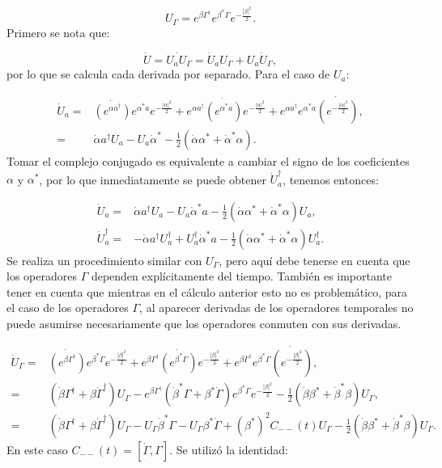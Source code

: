\documentclass[a4paper,10pt]{report}
\begin{document}
\begin{equation}
U_\Gamma = e^{\beta \Gamma^\dagger}e^{\beta^* \Gamma}e^{-\frac{|\beta|^2}{2}}.
\end{equation} Primero se nota que:

\begin{equation}
\dot{U} = \dot{U_aU_\Gamma} = \dot{U}_a U_\Gamma +  U_a \dot{U}_\Gamma,
\end{equation} por lo que se calcula cada derivada por separado. Para el caso de $U_a$:

\begin{align*}
\dot{U}_a =& \dot{(e^{\alpha a^\dagger})}e^{\alpha^* a}e^{-\frac{|\alpha|^2}{2}}
+e^{\alpha a^\dagger}\dot{(e^{\alpha^* a})}e^{-\frac{|\alpha|^2}{2}}+e^{\alpha a^\dagger}e^{\alpha^* a}\dot{(e^{-\frac{|\alpha|^2}{2}})},\\
=&\dot{\alpha} a^\dagger U_a - U_a\dot{\alpha}^* - \frac{1}{2}(\dot{\alpha} \alpha^*+\dot{\alpha}^* \alpha).
\end{align*} Tomar el complejo conjugado es equivalente a cambiar el signo de los coeficientes $\alpha$ y $\alpha^*$, por lo que inmediatamente se puede obtener $\dot{U}_a^\dagger$, tenemos entonces:

\begin{align}
\dot{U}_a=&\dot{\alpha} a^\dagger U_a - U_a\dot{\alpha}^*a - \frac{1}{2}(\dot{\alpha} \alpha^*+\dot{\alpha}^* \alpha)U_a,\\
\dot{U}_a^\dagger=&-\dot{\alpha} a^\dagger U_a^\dagger + U_a^\dagger\dot{\alpha}^*a - \frac{1}{2}(\dot{\alpha} \alpha^*+\dot{\alpha}^* \alpha)U_a^\dagger.
\end{align} Se realiza un procedimiento similar con $U_\Gamma$, pero aquí debe tenerse en cuenta que los operadores $\Gamma$ dependen explícitamente del tiempo. También es importante tener en cuenta que mientras en el cálculo anterior esto no es problemático, para el caso de los operadores $\Gamma$, al aparecer derivadas de los operadores temporales no puede asumirse necesariamente que los operadores conmuten con sus derivadas. 

\begin{align*}
\dot{U}_\Gamma =& \dot{(e^{\beta \Gamma^\dagger})}e^{\beta^* \Gamma}e^{-\frac{|\beta|^2}{2}}
+e^{\beta \Gamma^\dagger}\dot{(e^{\beta^* \Gamma})}e^{-\frac{|\beta|^2}{2}}+e^{\beta \Gamma^\dagger}e^{\beta^* \Gamma}\dot{(e^{-\frac{|\beta|^2}{2}})},\\
=&(\dot{\beta}\Gamma^\dagger +\beta \dot{\Gamma}^\dagger)U_\Gamma -e^{\beta \Gamma^\dagger}(\dot{\beta}^*\Gamma +\beta^* \dot{\Gamma})e^{\beta^* \Gamma}e^{-\frac{|\beta|^2}{2}} -\frac{1}{2}(\dot{\beta} \beta^*+\dot{\beta}^* \beta)U_\Gamma,\\
=&(\dot{\beta}\Gamma^\dagger +\beta \dot{\Gamma}^\dagger)U_\Gamma - U_\Gamma\dot{\beta}^*\Gamma-U_\Gamma\beta^* \dot{\Gamma} + (\beta^*)^2 C_{--}(t)U_\Gamma-\frac{1}{2}(\dot{\beta} \beta^*+\dot{\beta}^* \beta)U_\Gamma.
\end{align*} En este caso $C_{--}(t)=[\dot{\Gamma},\Gamma]$. Se utilizó la identidad:
\end{document}

